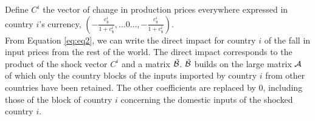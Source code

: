 \documentclass[11pt,a4paper]{article}
\begin{document}
%
%
%

Define $C^i$ the vector of change in production prices everywhere expressed in country $i$'s currency, 
$\left(-\frac{c_\$^i}{1+c_\$^i},\ldots0\ldots,-\frac{c_\$^i}{1+c_\$^i} \right)$. \\

From Equation \ref{eq:eq2}, we can write the direct impact for country $i$ of the fall in input prices from the rest of the world. The direct impact corresponds to the product of the shock vector $C^i$  and a matrix ${\tilde{{\cal B}}}$. ${\tilde{{\cal B}}}$ builds on the large matrix ${\cal A}$ of which only the country blocks of the inputs imported by country $i$ from other countries have been retained. The other coefficients are replaced by 0, including those of the block of country $i$ concerning the domestic inputs of the shocked country $i$. \\
\end{document}
